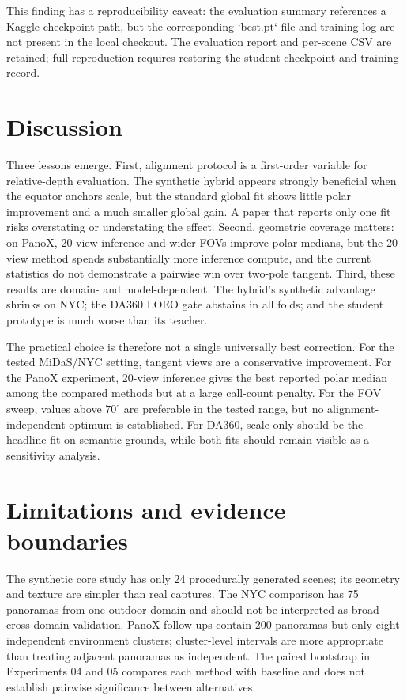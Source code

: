 \documentclass{article}
\begin{document}
This finding has a reproducibility caveat: the evaluation summary references a Kaggle checkpoint path, but the corresponding `best.pt` file and training log are not present in the local checkout. The evaluation report and per-scene CSV are retained; full reproduction requires restoring the student checkpoint and training record.

\section{Discussion}

Three lessons emerge. First, alignment protocol is a first-order variable for relative-depth evaluation. The synthetic hybrid appears strongly beneficial when the equator anchors scale, but the standard global fit shows little polar improvement and a much smaller global gain. A paper that reports only one fit risks overstating or understating the effect. Second, geometric coverage matters: on PanoX, 20-view inference and wider FOVs improve polar medians, but the 20-view method spends substantially more inference compute, and the current statistics do not demonstrate a pairwise win over two-pole tangent. Third, these results are domain- and model-dependent. The hybrid's synthetic advantage shrinks on NYC; the DA360 LOEO gate abstains in all folds; and the student prototype is much worse than its teacher.

The practical choice is therefore not a single universally best correction. For the tested MiDaS/NYC setting, tangent views are a conservative improvement. For the PanoX experiment, 20-view inference gives the best reported polar median among the compared methods but at a large call-count penalty. For the FOV sweep, values above $70^\circ$ are preferable in the tested range, but no alignment-independent optimum is established. For DA360, scale-only should be the headline fit on semantic grounds, while both fits should remain visible as a sensitivity analysis.

\section{Limitations and evidence boundaries}

The synthetic core study has only 24 procedurally generated scenes; its geometry and texture are simpler than real captures. The NYC comparison has 75 panoramas from one outdoor domain and should not be interpreted as broad cross-domain validation. PanoX follow-ups contain 200 panoramas but only eight independent environment clusters; cluster-level intervals are more appropriate than treating adjacent panoramas as independent. The paired bootstrap in Experiments 04 and 05 compares each method with baseline and does not establish pairwise significance between alternatives.
\end{document}
